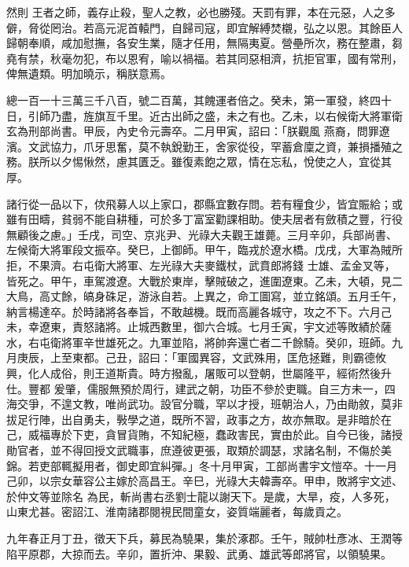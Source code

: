 \begin{pinyinscope}
 然則
 王者之師，義存止殺，聖人之教，必也勝殘。天罰有罪，本在元惡，人之多僻，脅從罔治。若高元泥首轅門，自歸司寇，即宜解縛焚櫬，弘之以恩。其餘臣人歸朝奉順，咸加慰撫，各安生業，隨才任用，無隔夷夏。營壘所次，務在整肅，芻堯有禁，秋毫勿犯，布以恩宥，喻以禍福。若其同惡相濟，抗拒官軍，國有常刑，俾無遺類。明加曉示，稱朕意焉。



 總一百一十三萬三千八百，號二百萬，其餽運者倍之。癸未，第一軍發，終四十日，引師乃盡，旌旗亙千里。近古出師之盛，未之有也。乙未，以右候衛大將軍衛玄為刑部尚書。甲辰，內史令元壽卒。二月甲寅，詔曰：「朕觀風
 燕裔，問罪遼濱。文武協力，爪牙思奮，莫不執銳勤王，舍家從役，罕蓄倉廩之資，兼損播殖之務。朕所以夕惕愀然，慮其匱乏。雖復素飽之眾，情在忘私，悅使之人，宜從其厚。



 諸行從一品以下，佽飛募人以上家口，郡縣宜數存問。若有糧食少，皆宜賑給；或雖有田疇，貧弱不能自耕種，可於多丁富室勸課相助。使夫居者有斂積之豐，行役無顧後之慮。」壬戌，司空、京兆尹、光祿大夫觀王雄薨。三月辛卯，兵部尚書、左候衛大將軍段文振卒。癸巳，上御師。甲午，臨戎於遼水橋。戊戌，大軍為賊所拒，不果濟。右屯衛大將軍、左光祿大夫麥鐵杖，武賁郎將錢
 士雄、孟金叉等，皆死之。甲午，車駕渡遼。大戰於東岸，擊賊破之，進圍遼東。乙未，大頓，見二大鳥，高丈餘，皜身硃足，游泳自若。上異之，命工圖寫，並立銘頌。五月壬午，納言楊達卒。於時諸將各奉旨，不敢越機。既而高麗各城守，攻之不下。六月己未，幸遼東，責怒諸將。止城西數里，御六合城。七月壬寅，宇文述等敗績於薩水，右屯衛將軍辛世雄死之。九軍並陷，將帥奔還亡者二千餘騎。癸卯，班師。九月庚辰，上至東都。己丑，詔曰：「軍國異容，文武殊用，匡危拯難，則霸德攸興，化人成俗，則王道斯貴。時方撥亂，屠販可以登朝，世屬隆平，經術然後升仕。豐都
 爰肇，儒服無預於周行，建武之朝，功臣不參於吏職。自三方未一，四海交爭，不遑文教，唯尚武功。設官分職，罕以才授，班朝治人，乃由勛敘，莫非拔足行陣，出自勇夫，斅學之道，既所不習，政事之方，故亦無取。是非暗於在己，威福專於下吏，貪冒貨賄，不知紀極，蠢政害民，實由於此。自今已後，諸授勛官者，並不得回授文武職事，庶遵彼更張，取類於調瑟，求諸名制，不傷於美錦。若吏部輒擬用者，御史即宜糾彈。」冬十月甲寅，工部尚書宇文愷卒。十一月己卯，以宗女華容公主嫁於高昌王。辛巳，光祿大夫韓壽卒。甲申，敗將宇文述、於仲文等並除名
 為民，斬尚書右丞劉士龍以謝天下。是歲，大旱，疫，人多死，山東尤甚。密詔江、淮南諸郡閱視民間童女，姿質端麗者，每歲貢之。



 九年春正月丁丑，徵天下兵，募民為驍果，集於涿郡。壬午，賊帥杜彥冰、王潤等陷平原郡，大掠而去。辛卯，置折沖、果毅、武勇、雄武等郎將官，以領驍果。




\end{pinyinscope}
